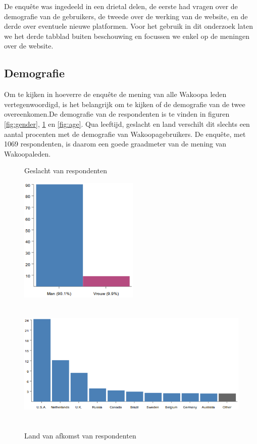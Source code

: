 \documentclass[a4paper, 10pt, pdftex]{report}
\begin{document}
    De enqu\^ete was ingedeeld in een drietal delen, de eerste had vragen over de demografie van de gebruikers, de tweede over de werking van de website, en de derde over eventuele nieuwe platformen. Voor het gebruik in dit onderzoek laten we het derde tabblad buiten beschouwing en focussen we enkel op de meningen over de website.

      \subsection{Demografie}
        Om te kijken in hoeverre de enqu\^ete de mening van alle Wakoopa leden vertegenwoordigd, is het belangrijk om te kijken of de demografie van de twee overeenkomen.De demografie van de respondenten is te vinden in figuren \ref{fig:gender}, \ref{fig:country} en \ref{fig:age}. Qua leeftijd, geslacht en land verschilt dit slechts een aantal procenten met de demografie van Wakoopagebruikers. De enqu\^ete, met 1069 respondenten, is daarom een goede graadmeter van de mening van Wakoopaleden.
        \begin{figure}
          \begin{center}
          \caption{Geslacht van respondenten}
            \includegraphics[height=60mm, angle=90]{../images/enquete/gender}
          \label{fig:gender}

          \caption{Land van afkomst van respondenten}
            \includegraphics[height=60mm, angle=90]{../images/enquete/country}
            \label{fig:country}

          \end{center}
        \end{figure}
\end{document}
